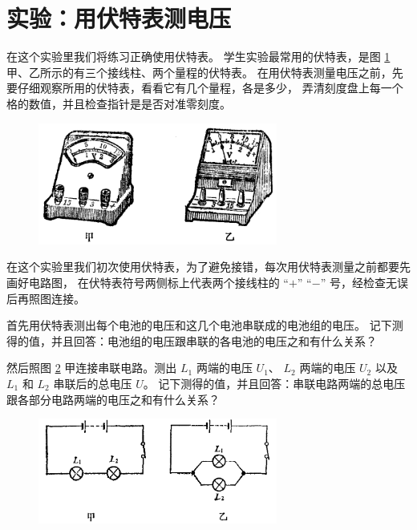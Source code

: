 \section{实验：用伏特表测电压}\label{sec:8-4}

在这个实验里我们将练习正确使用伏特表。
学生实验最常用的伏特表，是图 \ref{fig:8-12} 甲、乙所示的有三个接线柱、两个量程的伏特表。
在用伏特表测量电压之前，先要仔细观察所用的伏特表，看看它有几个量程，各是多少，
弄清刻度盘上每一个格的数值，并且检查指针是是否对准零刻度。

\begin{figure}[htbp]
    \centering
    \includegraphics[width=0.7\textwidth]{../pic/czwl2-ch8-12}
    \caption{}\label{fig:8-12}
\end{figure}

在这个实验里我们初次使用伏特表，为了避免接错，每次用伏特表测量之前都要先画好电路图，
在伏特表符号两侧标上代表两个接线柱的 “$+$” “$-$” 号，经检查无误后再照图连接。

首先用伏特表测出每个电池的电压和这几个电池串联成的电池组的电压。
记下测得的值，并且回答：电池组的电压跟串联的各电池的电压之和有什么关系？

然后照图 \ref{fig:8-13} 甲连接串联电路。测出 $L_1$ 两端的电压 $U_1$、
$L_2$ 两端的电压 $U_2$ 以及 $L_1$ 和 $L_2$ 串联后的总电压 $U$。
记下测得的值，并且回答：串联电路两端的总电压跟各部分电路两端的电压之和有什么关系？

\begin{figure}[htbp]
    \centering
    \includegraphics[width=0.7\textwidth]{../pic/czwl2-ch8-13}
    \caption{}\label{fig:8-13}
\end{figure}

